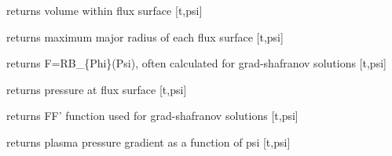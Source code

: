 \documentclass[letterpaper,10pt,english]{sphinxmanual}
\begin{document}
\begin{fulllineitems}
\begin{fulllineitems}
\label{eqtools:eqtools.CModEFIT.CModEFITTree.getFluxVol}
returns volume within flux surface {[}t,psi{]}

\end{fulllineitems}


\begin{fulllineitems}
\label{eqtools:eqtools.CModEFIT.CModEFITTree.getRmidPsi}
returns maximum major radius of each flux surface {[}t,psi{]}

\end{fulllineitems}


\begin{fulllineitems}
\label{eqtools:eqtools.CModEFIT.CModEFITTree.getF}
returns F=RB\_\{Phi\}(Psi), often calculated for grad-shafranov solutions  {[}t,psi{]}

\end{fulllineitems}


\begin{fulllineitems}
\label{eqtools:eqtools.CModEFIT.CModEFITTree.getFluxPres}
returns pressure at flux surface {[}t,psi{]}

\end{fulllineitems}


\begin{fulllineitems}
\label{eqtools:eqtools.CModEFIT.CModEFITTree.getFFPrime}
returns FF' function used for grad-shafranov solutions {[}t,psi{]}

\end{fulllineitems}


\begin{fulllineitems}
\label{eqtools:eqtools.CModEFIT.CModEFITTree.getPPrime}
returns plasma pressure gradient as a function of psi {[}t,psi{]}


\end{fulllineitems}
\end{fulllineitems}
\end{document}
